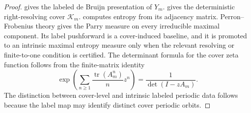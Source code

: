 \begin{proof}
 gives the labeled de Bruijn presentation of \(Y_m\).   gives the deterministic right-resolving cover \(\mathcal K_m\).   computes entropy from its adjacency matrix.  Perron--Frobenius theory gives the Parry measure on every irreducible maximal component.  Its label pushforward is a cover-induced baseline, and it is promoted to an intrinsic maximal entropy measure only when the relevant resolving or finite-to-one condition is certified.  The determinant formula for the cover zeta function follows from the finite-matrix identity
\[
\exp\left(\sum_{n\ge1}\frac{\operatorname{tr}(A_m^n)}n z^n\right)
=
\frac1{\det(I-zA_m)}.
\]
The distinction between cover-level and intrinsic labeled periodic data follows because the label map may identify distinct cover periodic orbits.
\end{proof}
